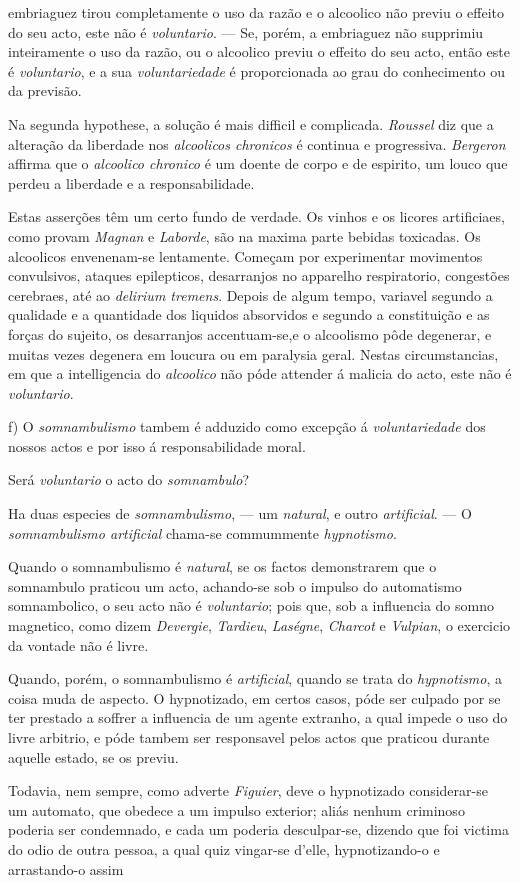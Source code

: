 embriaguez tirou completamente o uso da razão e o alcoolico não previu o effeito do seu acto, este não é \emph{voluntario}. --- Se, porém, a embriaguez não supprimiu inteiramente o uso da razão, ou o alcoolico previu o effeito do seu acto, então este é \emph{voluntario}, e a sua \emph{voluntariedade} é proporcionada ao grau do conhecimento ou da previsão.\par Na segunda hypothese, a solução é mais difficil e complicada. \emph{Roussel} diz que a alteração da liberdade nos \emph{alcoolicos chronicos} é continua e progressiva. \emph{Bergeron} affirma que o \emph{alcoolico chronico} é um doente de corpo e de espirito, um louco que perdeu a liberdade e a responsabilidade.\par Estas asserções têm um certo fundo de verdade. Os vinhos e os licores artificiaes, como provam \emph{Magnan} e \emph{Laborde}, são na maxima parte bebidas toxicadas. Os alcoolicos envenenam-se lentamente. Começam por experimentar movimentos convulsivos, ataques epilepticos, desarranjos no apparelho respiratorio, congestões cerebraes, até ao \emph{delirium tremens}. Depois de algum tempo, variavel segundo a qualidade e a quantidade dos liquidos absorvidos e segundo a constituição e as forças do sujeito, os desarranjos accentuam-se,e o alcoolismo pôde degenerar, e muitas vezes degenera em loucura ou em paralysia geral. Nestas circumstancias, em que a intelligencia do \emph{alcoolico} não póde attender á malicia do acto, este não é \emph{voluntario}.\par f) O \emph{somnambulismo} tambem é adduzido como excepção á \emph{voluntariedade} dos nossos actos e por isso á responsabilidade moral.\par Será \emph{voluntario} o acto do \emph{somnambulo}?\par Ha duas especies de \emph{somnambulismo}, --- um \emph{natural}, e outro \emph{artificial}. --- O \emph{somnambulismo artificial} chama-se commummente \emph{hypnotismo}.\par Quando o somnambulismo é \emph{natural}, se os factos demonstrarem que o somnambulo praticou um acto, achando-se sob o impulso do automatismo somnambolico, o seu acto não é \emph{voluntario}; pois que, sob a influencia do somno magnetico, como dizem \emph{Devergie}, \emph{Tardieu}, \emph{Laségne}, \emph{Charcot} e \emph{Vulpian}, o exercicio da vontade não é livre.\par Quando, porém, o somnambulismo é \emph{artificial}, quando se trata do \emph{hypnotismo}, a coisa muda de aspecto. O hypnotizado, em certos casos, póde ser culpado por se ter prestado a soffrer a influencia de um agente extranho, a qual impede o uso do livre arbitrio, e póde tambem ser responsavel pelos actos que praticou durante aquelle estado, se os previu.\par Todavia, nem sempre, como adverte \emph{Figuier}, deve o hypnotizado considerar-se um automato, que obedece a um impulso exterior; aliás nenhum criminoso poderia ser condemnado, e cada um poderia desculpar-se, dizendo que foi victima do odio de outra pessoa, a qual quiz vingar-se d'elle, hypnotizando-o e arrastando-o assim 